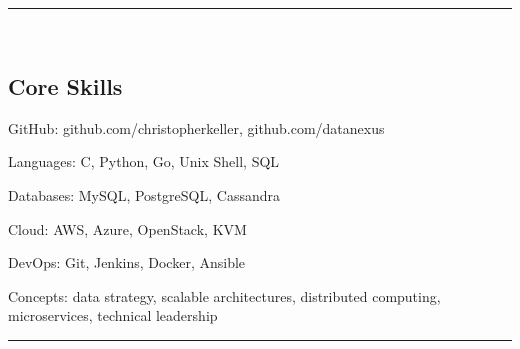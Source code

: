 

\hrule\
\vspace{-0.4em}
\subsection*{Core Skills}
\begin{indentsection}{\parindent}
    \begin{description*}
        \item[GitHub:] github.com/christopherkeller, github.com/datanexus
        \item[Languages:] C, Python, Go, Unix Shell, \textsc{SQL}
        \item[Databases:] My\textsc{SQL}, Postgre\textsc{SQL}, Cassandra
        \item[Cloud:] AWS, Azure, OpenStack, KVM 
        \item[DevOps:] Git, Jenkins, Docker, Ansible
        \item[Concepts:] data strategy, scalable architectures, distributed computing, microservices, technical leadership
	\end{description*}
\end{indentsection}
\hrule\
\vspace{-0.4em}
